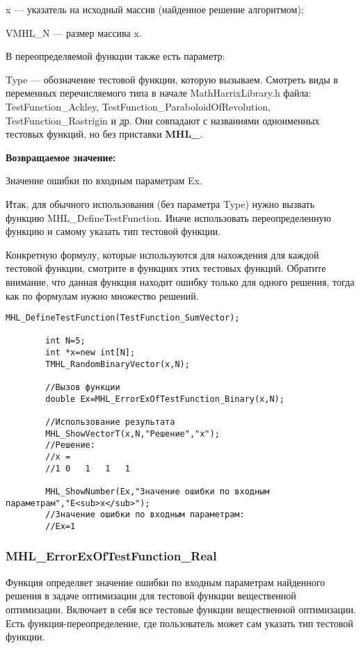 \documentclass[a4paper,12pt]{article}
\begin{document}
x --- указатель на исходный массив (найденное решение алгоритмом);

VMHL\_N --- размер массива x.

В переопределяемой функции также есть параметр:
  
Type --- обозначение тестовой функции, которую вызываем.
Смотреть виды в переменных перечисляемого типа в начале MathHarrixLibrary.h файла: TestFunction\_Ackley, TestFunction\_ParaboloidOfRevolution, TestFunction\_Rastrigin и др. Они совпадают с названиями одноименных тестовых функций, но без приставки \textbf{MHL\_}.

\textbf{Возвращаемое значение:}
 
Значение ошибки по входным параметрам Ex.

Итак, для обычного использования (без параметра Type) нужно вызвать функцию MHL\_DefineTestFunction. Иначе использовать переопределенную функцию и самому указать тип тестовой функции.

Конкретную формулу, которые используются для нахождения для каждой тестовой функции, смотрите в функциях этих тестовых функций. Обратите внимание, что данная функция находит ошибку только для одного решения, тогда как по формулам нужно множество решений.


\begin{lstlisting}[label=code_use_MHL_ErrorExOfTestFunction_Binary,caption=Пример использования]
        MHL_DefineTestFunction(TestFunction_SumVector);

        int N=5;
        int *x=new int[N];
        TMHL_RandomBinaryVector(x,N);

        //Вызов функции
        double Ex=MHL_ErrorExOfTestFunction_Binary(x,N);

        //Использование результата
        MHL_ShowVectorT(x,N,"Решение","x");
        //Решение:
        //x =	
        //1	0	1	1	1

        MHL_ShowNumber(Ex,"Значение ошибки по входным параметрам","E<sub>x</sub>");
        //Значение ошибки по входным параметрам:
        //Ex=1
\end{lstlisting}

\subsubsection{MHL\_ErrorExOfTestFunction\_Real}\label{MHL_ErrorExOfTestFunction_Real}

Функция определяет значение ошибки по входным параметрам найденного решения в задаче оптимизации для тестовой функции вещественной оптимизации. Включает в себя все тестовые функции вещественной оптимизации. Есть функция-переопределение, где пользователь может сам указать тип тестовой функции.
\end{document}
